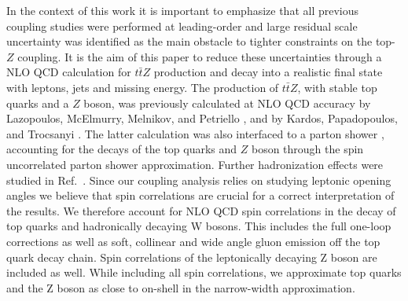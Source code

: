 \documentclass[preprint]{JHEP3} %
\def\Dphill{\Delta \phi_{ll}}
\def\ttbZ{t\bar{t}Z}
\def\ptZ{p_{t,Z}}
\begin{document}
In the context of this work it is important to emphasize that all previous coupling studies were performed at leading-order and large residual scale uncertainty 
was identified \cite{Baur:2004uw} as the main obstacle to tighter constraints on the top-$Z$ coupling.
It is the aim of this paper to reduce these uncertainties through a NLO QCD calculation for $\ttbZ$ production and decay into a realistic final state with leptons, jets and missing energy.
The production of $\ttbZ$, with stable top quarks and a $Z$ boson, was previously calculated at NLO QCD accuracy by 
Lazopoulos, McElmurry, Melnikov, and Petriello \cite{Lazopoulos:2008de}, and  by Kardos, Papadopoulos, and Trocsanyi \cite{Kardos:2011na}.
The latter calculation was also interfaced to a parton shower \cite{Garzelli:2011is}, accounting for the decays of the top quarks and $Z$ boson through 
the spin uncorrelated parton shower approximation.
Further hadronization effects were studied in Ref.~\cite{Garzelli:2012bn}.
Since our coupling analysis relies on studying leptonic opening angles we believe that spin correlations are crucial for a correct interpretation of the results.
We therefore account for NLO QCD spin correlations in the decay of top quarks and hadronically decaying W bosons.
This includes the full one-loop corrections as well as soft, collinear and wide angle gluon emission off the top quark decay chain.
Spin correlations of the leptonically decaying Z boson are included as well.
While including all spin correlations, we approximate top quarks and the Z boson as close to on-shell in the narrow-width approximation.
\end{document}

